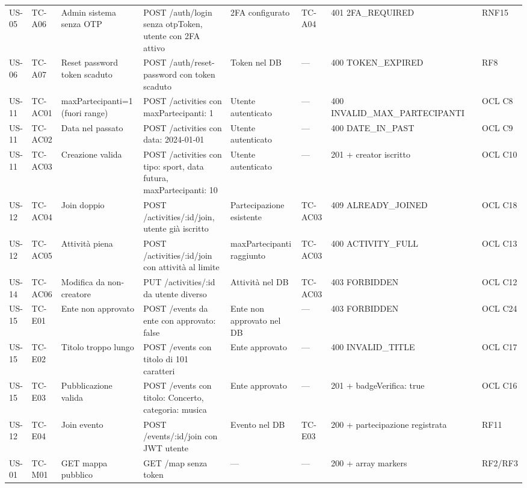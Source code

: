 \documentclass[11pt,a4paper]{article}
\begin{document}
\begin{longtable}{p{0.9cm} p{1.1cm} p{2.6cm} p{3.0cm} p{1.8cm} p{1.0cm} p{2.4cm} p{0.9cm} p{1.3cm}}
  \rowcolor{rowAlt}
  US-05 & TC-A06 & Admin sistema senza OTP & POST /auth/login senza otpToken, utente con 2FA attivo & 2FA configurato & TC-A04 & 401 2FA\_REQUIRED & & RNF15 \\
  US-06 & TC-A07 & Reset password token scaduto & POST /auth/reset-password con token scaduto & Token nel DB & --- & 400 TOKEN\_EXPIRED & & RF8 \\
  \midrule
  \rowcolor{rowAlt}
  US-11 & TC-AC01 & maxPartecipanti=1 (fuori range) & POST /activities con maxPartecipanti: 1 & Utente autenticato & --- & 400 INVALID\_MAX\_PARTECIPANTI & & OCL C8 \\
  US-11 & TC-AC02 & Data nel passato & POST /activities con data: 2024-01-01 & Utente autenticato & --- & 400 DATE\_IN\_PAST & & OCL C9 \\
  \rowcolor{rowAlt}
  US-11 & TC-AC03 & Creazione valida & POST /activities con tipo: sport, data futura, maxPartecipanti: 10 & Utente autenticato & --- & 201 + creator iscritto & & OCL C10 \\
  US-12 & TC-AC04 & Join doppio & POST /activities/:id/join, utente gi\`{a} iscritto & Partecipazione esistente & TC-AC03 & 409 ALREADY\_JOINED & & OCL C18 \\
  \rowcolor{rowAlt}
  US-12 & TC-AC05 & Attivit\`{a} piena & POST /activities/:id/join con attivit\`{a} al limite & maxPartecipanti raggiunto & TC-AC03 & 400 ACTIVITY\_FULL & & OCL C13 \\
  US-14 & TC-AC06 & Modifica da non-creatore & PUT /activities/:id da utente diverso & Attivit\`{a} nel DB & TC-AC03 & 403 FORBIDDEN & & OCL C12 \\
  \midrule
  \rowcolor{rowAlt}
  US-15 & TC-E01 & Ente non approvato & POST /events da ente con approvato: false & Ente non approvato nel DB & --- & 403 FORBIDDEN & & OCL C24 \\
  US-15 & TC-E02 & Titolo troppo lungo & POST /events con titolo di 101 caratteri & Ente approvato & --- & 400 INVALID\_TITLE & & OCL C17 \\
  \rowcolor{rowAlt}
  US-15 & TC-E03 & Pubblicazione valida & POST /events con titolo: Concerto, categoria: musica & Ente approvato & --- & 201 + badgeVerifica: true & & OCL C16 \\
  US-12 & TC-E04 & Join evento & POST /events/:id/join con JWT utente & Evento nel DB & TC-E03 & 200 + partecipazione registrata & & RF11 \\
  \midrule
  \rowcolor{rowAlt}
  US-01 & TC-M01 & GET mappa pubblico & GET /map senza token & --- & --- & 200 + array markers & & RF2/RF3 \\

\end{longtable}
\end{document}
